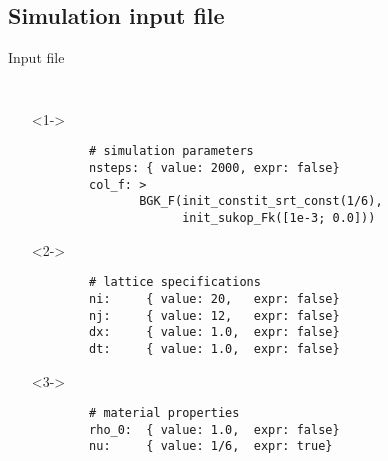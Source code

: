 \documentclass[pdf]{beamer}
\begin{document}
\subsection{Simulation input file}

\begin{frame}[fragile]{Input file}
  \begin{columns}
      \tiny
      \begin{itemize}
        \item[] <1->
      \begin{verbatim}
        # simulation parameters
        nsteps: { value: 2000, expr: false}
        col_f: >
               BGK_F(init_constit_srt_const(1/6),
                     init_sukop_Fk([1e-3; 0.0]))
      \end{verbatim}

    \item[] <2->
      \begin{verbatim}
        # lattice specifications
        ni:     { value: 20,   expr: false}
        nj:     { value: 12,   expr: false}
        dx:     { value: 1.0,  expr: false}
        dt:     { value: 1.0,  expr: false}
      \end{verbatim}

    \item[] <3->
      \begin{verbatim}
        # material properties
        rho_0:  { value: 1.0,  expr: false}
        nu:     { value: 1/6,  expr: true}
      \end{verbatim}


\end{itemize}
\end{columns}
\end{frame}
\end{document}
